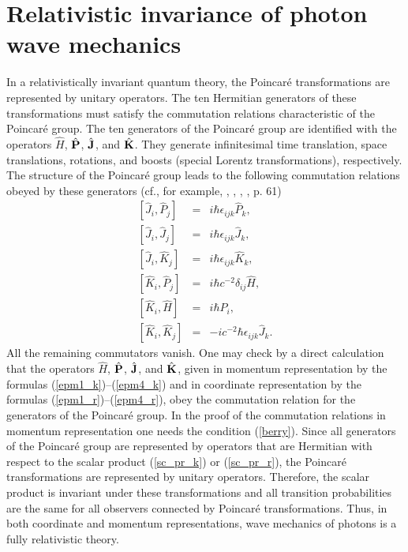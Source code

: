 \documentclass{article}
\begin{document}
\section[RELATIVISTIC INVARIANCE]{Relativistic invariance of photon wave
mechanics\label{invariance}}

In a relativistically invariant quantum theory, the Poincar\'e
transformations are represented by unitary operators. The ten Hermitian
generators of these transformations must satisfy the commutation relations
characteristic of the Poincar\'e group. The ten generators of the Poincar\'e
group are identified with the operators ${\hat H}$, ${\hat{\bf P}}$,
${\hat{\bf J}}$, and ${\hat{\bf K}}$. They generate infinitesimal time
translation, space translations, rotations, and boosts (special Lorentz
transformations), respectively. The structure of the Poincar\'e group leads
to the following commutation relations obeyed by these generators (cf., for
example, \cite{BW_48}, \cite{BBBB_75}, \cite{IZ_80}, \cite{Weinberg_95}, p.
61)
\begin{eqnarray}
 \left[{\hat J}_i,{\hat P}_j\right] &=& i\hbar \epsilon_{ijk}{\hat P}_k,
 \label{cmp}\\
 \left[{\hat J}_i,{\hat J}_j\right] &=& i\hbar \epsilon_{ijk}{\hat J}_k,
 \label{cmm}\\
 \left[{\hat J}_i,{\hat K}_j\right] &=& i\hbar \epsilon_{ijk}{\hat K}_k,
 \label{cmn}\\
 \left[{\hat K}_i,{\hat P}_j\right] &=& i\hbar  c^{-2}\delta_{ij}{\hat H},
 \label{cnp}\\
 \left[{\hat K}_i,{\hat H}\right] &=& i\hbar {\hat P}_i,\label{cne}\\
 \left[{\hat K}_i,{\hat K}_j\right]
 &=& -ic^{-2}\hbar\epsilon_{ijk}{\hat J}_k.\label{cnn}
\end{eqnarray}
All the remaining commutators vanish. One may check by a direct calculation
that the operators ${\hat H}$, ${\hat{\bf P}}$, ${\hat{\bf J}}$, and
${\hat{\bf K}}$, given in momentum representation by the formulas
(\ref{epm1_k})--(\ref{epm4_k}) and in coordinate representation by the
formulas (\ref{epm1_r})--(\ref{epm4_r}), obey the commutation relation for
the generators of the Poincar\'e group. In the proof of the commutation
relations in momentum representation one needs the condition (\ref{berry}).
Since all generators of the Poincar\'e group are represented by operators
that are Hermitian with respect to the scalar product (\ref{sc_pr_k}) or
(\ref{sc_pr_r}), the Poincar\'e transformations are represented by unitary operators. Therefore, the scalar product is invariant under these
transformations and all transition probabilities are the same for all
observers connected by Poincar\'e transformations. Thus, in both coordinate
and momentum representations, wave mechanics of photons is a fully
relativistic theory.
\end{document}
